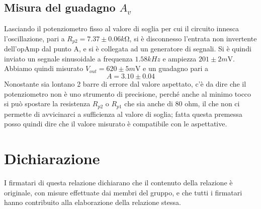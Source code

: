 \documentclass[10pt, a4paper, italian]{article}
\begin{document}
\subsection{Misura del guadagno $A_v$}
Lasciando il potenziometro fisso al valore di soglia per cui il circuito innesca l'oscillazione, pari a $R_{p2}=7.37 \pm 0.06 \si{k\ohm}$, si è disconnesso l'entrata non invertente dell'opAmp dal punto A, e si è collegata ad un generatore di segnali. Si è quindi inviato un segnale sinusoidale a frequenza $1.58 kHz$ e ampiezza $201 \pm 2 \si{m\V}$. Abbiamo quindi misurato $V_{out}=620 \pm 5 \si{m\V}$ e un guadagno pari a
\[
A=3.10 \pm 0.04
\]
Nonostante sia lontano 2 barre di errore dal valore aspettato, c'è da dire che il potenziometro non è uno strumento di precisione, perché anche al minimo tocco si può spostare la resistenza $R_{p2}$ o $R_{p1}$ che sia anche di 80 ohm, il che non ci permette di avvicinarci a sufficienza al valore di soglia; fatta questa premessa posso quindi dire che il valore misurato è compatibile con le aspettative.
\section*{Dichiarazione}
I firmatari di questa relazione dichiarano che il contenuto della relazione \`e
originale, con misure effettuate dai membri del gruppo, e che tutti i firmatari
hanno contribuito alla elaborazione della relazione stessa.
\end{document}
